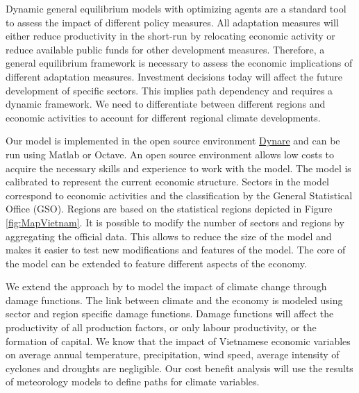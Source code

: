 \documentclass[10pt,a4paper]{article}
\begin{document}
Dynamic general equilibrium models with optimizing agents are a standard tool to assess the impact of different policy measures. All adaptation measures will either reduce productivity in the short-run by relocating economic activity or reduce available public funds for other development measures. Therefore, a general equilibrium framework is necessary to assess the economic implications of different adaptation measures. Investment decisions today will affect the future development of specific sectors. This implies path dependency and requires a dynamic framework. We need to differentiate between different regions and economic activities to account for different regional climate developments.

Our model is implemented in the open source environment \href{https://www.dynare.org/}{Dynare} and can be run using Matlab or Octave. An open source environment allows low costs to acquire the necessary skills and experience to work with the model. The model is calibrated to represent the current economic structure. Sectors in the model correspond to economic activities and the classification by the General Statistical Office (GSO). Regions are based on the statistical regions depicted in Figure \ref{fig:MapVietnam}. It is possible to modify the number of sectors and regions by aggregating the official data. This allows to reduce the size of the model and makes it easier to test new modifications and features of the model. The core of the model can be extended to feature different aspects of the economy. %

We extend the approach by \cite{nordhaus1993optimal} to model the impact of climate change through damage functions. The link between climate and the economy is modeled using sector and region specific damage functions. Damage functions will affect the productivity of all production factors, or only labour productivity, or the formation of capital. We know that the impact of Vietnamese economic variables on average annual temperature, precipitation, wind speed, average intensity of cyclones and droughts are negligible. Our cost benefit analysis will use the results of meteorology models to define paths for climate variables.
\end{document}
